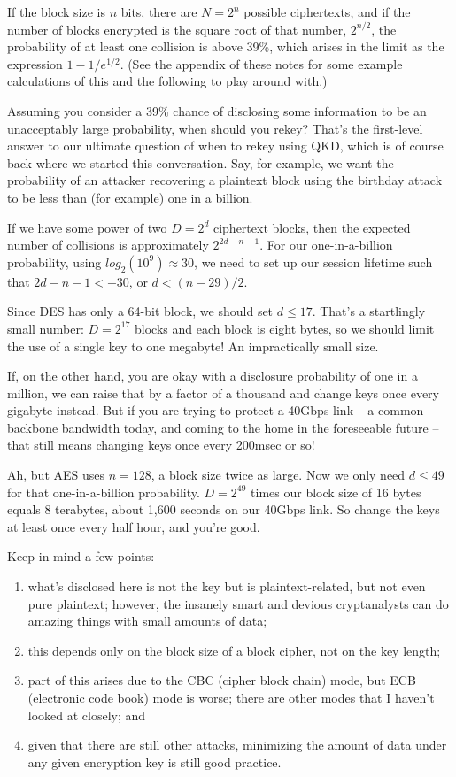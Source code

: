 \documentclass[%
 aip,
 jmp,%
 amsmath,amssymb,
 reprint,%
]{revtex4-1}
\begin{document}
If the block size is $n$ bits, there are $N = 2^n$ possible
ciphertexts, and if the number of blocks encrypted is the square root
of that number, $2^{n/2}$, the probability of at least one collision
is above 39\%, which arises in the limit as the expression
$1-1/e^{1/2}$.  (See the appendix of these notes for some example
calculations of this and the following to play around with.)

Assuming you consider a 39\% chance of disclosing some information to
be an unacceptably large probability, when should you rekey?  That's
the first-level answer to our ultimate question of when to rekey using
QKD, which is of course back where we started this conversation.  Say,
for example, we want the probability of an attacker recovering a
plaintext block using the birthday attack to be less than (for
example) one in a billion.

If we have some power of two $D = 2^d$ ciphertext blocks, then the
expected number of collisions is approximately $2^{2d-n-1}$.  For our
one-in-a-billion probability, using $log_2(10^9) \approx 30$, we need
to set up our session lifetime such that $2d-n-1 < -30$, or $d <
(n-29)/2$.

Since DES has only a 64-bit block, we should set $d \le 17$.  That's a
startlingly small number: $D = 2^{17}$ blocks and each block is eight
bytes, so we should limit the use of a single key to one megabyte!
An impractically small size.

If, on the other hand, you are okay with a disclosure probability of
one in a million, we can raise that by a factor of a thousand and
change keys once every gigabyte instead.  But if you are trying to
protect a 40Gbps link -- a common backbone bandwidth today, and coming
to the home in the foreseeable future -- that still means changing
keys once every 200msec or so!

Ah, but AES uses $n = 128$, a block size twice as large.  Now we only
need $d \le 49$ for that one-in-a-billion probability.  $D = 2^{49}$
times our block size of 16 bytes equals 8 terabytes, about 1,600
seconds on our 40Gbps link.  So change the keys at least once every
half hour, and you're good.

Keep in mind a few points:
\begin{enumerate}
\item what's disclosed here is not the key but is plaintext-related, but
   not even pure plaintext; however, the insanely smart and devious
   cryptanalysts can do amazing things with small amounts of data;
\item this depends only on the block size of a block cipher, not on the
   key length;
\item part of this arises due to the CBC (cipher block chain) mode, but
   ECB (electronic code book) mode is worse; there are other modes
   that I haven't looked at closely; and
\item given that there are still other attacks, minimizing the amount of
   data under any given encryption key is still good practice.
\end{enumerate}
\end{document}
